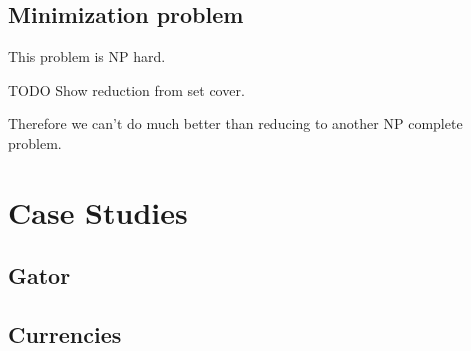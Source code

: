 \documentclass{article}
\begin{document}
\subsection{Minimization problem}
This problem is NP hard.

TODO Show reduction from set cover.

Therefore we can't do much better than reducing to another NP complete problem. 

\section{Case Studies}

\subsection{Gator}
\subsection{Currencies}
\end{document}
